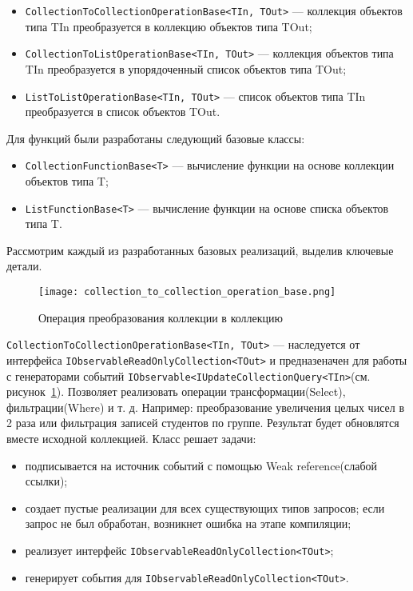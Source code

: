 \begin{itemize}
  \item \lstinline[style=csharpinlinestyle]!CollectionToCollectionOperationBase<TIn, TOut>! --- коллекция объектов типа TIn преобразуется в коллекцию объектов типа TOut;
  \item \lstinline[style=csharpinlinestyle]!CollectionToListOperationBase<TIn, TOut>! --- коллекция объектов типа TIn преобразуется в упорядоченный список объектов типа TOut;
  \item \lstinline[style=csharpinlinestyle]!ListToListOperationBase<TIn, TOut>! --- список объектов типа TIn преобразуется в список объектов TOut.
\end{itemize}

Для функций были разработаны следующий базовые классы:

\begin{itemize}
  \item \lstinline[style=csharpinlinestyle]!CollectionFunctionBase<T>! --- вычисление функции на основе коллекции объектов типа T;
  \item \lstinline[style=csharpinlinestyle]!ListFunctionBase<T>! --- вычисление функции на основе списка объектов типа T.
\end{itemize}

Рассмотрим каждый из разработанных базовых реализаций, выделив ключевые детали.

\begin{figure}[ht]
\centering
  \texttt{[image: collection\_to\_collection\_operation\_base.png]}
  \caption{ Операция преобразования коллекции в коллекцию }
  \label{fig:collection_to_collection_operation_base}
\end{figure}

\lstinline[style=csharpinlinestyle]!CollectionToCollectionOperationBase<TIn, TOut>! --- наследуется от  интерфейса \lstinline[style=csharpinlinestyle]!IObservableReadOnlyCollection<TOut>!
и предназеначен для работы с генераторами событий \lstinline[style=csharpinlinestyle]!IObservable<IUpdateCollectionQuery<TIn>!(см. рисунок~\ref{fig:collection_to_collection_operation_base}).
Позволяет реализовать операции трансформации(Select), фильтрации(Where) и т. д. Например: преобразование увеличения целых чисел в 2 раза или фильтрация записей студентов по группе.
Результат будет обновлятся вместе исходной коллекцией. Класс решает задачи:

\begin{itemize}
  \item подписывается на источник событий с помощью Weak reference(слабой ссылки)\cite{weak_reference};
  \item создает пустые реализации для всех существующих типов запросов; если запрос не был обработан, возникнет ошибка на этапе компиляции;
  \item реализует интерфейс \lstinline[style=csharpinlinestyle]!IObservableReadOnlyCollection<TOut>!;
  \item генерирует события для \lstinline[style=csharpinlinestyle]!IObservableReadOnlyCollection<TOut>!.
\end{itemize}

